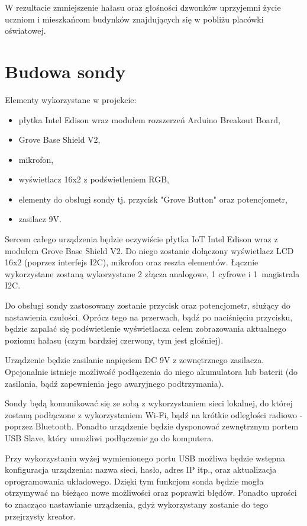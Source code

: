 \documentclass[12pt, a4paper]{article}
\begin{document}
W rezultacie zmniejszenie hałasu oraz głośności dzwonków uprzyjemni życie uczniom i mieszkańcom budynków znajdujących się w pobliżu placówki oświatowej.

\section{Budowa sondy}

Elementy wykorzystane w projekcie:
\begin{itemize}
\item płytka Intel Edison wraz modułem rozszerzeń Arduino Breakout Board,
\item Grove Base Shield V2,
\item mikrofon,
\item wyświetlacz 16x2 z podświetleniem RGB,
\item elementy do obsługi sondy tj. przycisk "Grove Button" oraz potencjometr,
\item zasilacz 9V.
\end{itemize}

Sercem całego urządzenia będzie oczywiście płytka IoT Intel Edison wraz z modułem Grove Base Shield V2. Do niego zostanie dołączony wyświetlacz LCD 16x2 (poprzez interfejs I2C), mikrofon oraz reszta elementów. Łącznie wykorzystane zostaną wykorzystane 2 złącza analogowe, 1 cyfrowe i 1~magistrala I2C. 

Do obsługi sondy zastosowany zostanie przycisk oraz potencjometr, służący do nastawienia czułości. Oprócz tego na przerwach, bądź po naciśnięciu przycisku, będzie zapalać się podświetlenie wyświetlacza celem zobrazowania aktualnego poziomu hałasu (czym bardziej czerwony, tym jest głośniej).

Urządzenie będzie zasilanie napięciem DC 9V z zewnętrznego zasilacza. Opcjonalnie istnieje możliwość podłączenia do niego akumulatora lub baterii (do zasilania, bądź zapewnienia jego awaryjnego podtrzymania).

Sondy będą komunikować się ze sobą z wykorzystaniem sieci lokalnej, do której zostaną podłączone z wykorzystaniem Wi-Fi, bądź na krótkie odległości radiowo - poprzez Bluetooth. Ponadto urządzenie będzie dysponować zewnętrznym portem USB Slave, który umożliwi podłączenie go do komputera.

Przy wykorzystaniu wyżej wymienionego portu USB możliwa będzie wstępna konfiguracja urządzenia: nazwa sieci, hasło, adres IP itp., oraz aktualizacja oprogramowania układowego. Dzięki tym funkcjom sonda będzie mogła otrzymywać na bieżąco nowe możliwości oraz poprawki błędów. Ponadto uprości to znacząco nastawianie urządzenia, gdyż wykorzystany zostanie do tego przejrzysty kreator.
\end{document}

